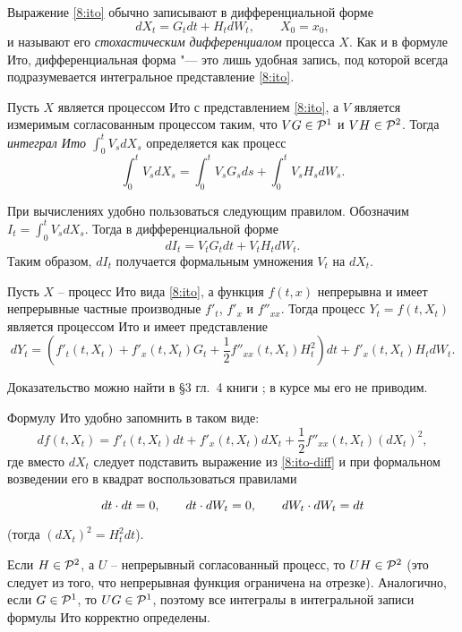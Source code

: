 Выражение \eqref{8:ito} обычно записывают в дифференциальной форме
\begin{equation}
\label{8:ito-diff}
dX_t = G_t dt + H_t dW_t, \qquad X_0=x_0,
\end{equation}
и называют его \emph{стохастическим дифференциалом} процесса $X$.
Как и в формуле Ито, дифференциальная форма "--- это лишь удобная запись, под которой всегда подразумевается интегральное представление \eqref{8:ito}.

\begin{definition}
Пусть $X$ является процессом Ито с представлением \eqref{8:ito}, а $V$ является измеримым согласованным процессом таким, что $VG \in \mathcal{P}^1$ и $VH \in \mathcal{P}^2$.
Тогда \emph{интеграл Ито $\int_0^t V_s d X_s$} определяется как процесс
\[
\int_0^t V_s dX_s = \int_0^t V_s G_s ds + \int_0^t V_s H_s d W_s.
\]
\end{definition}

При вычислениях удобно пользоваться следующим правилом.
Обозначим $I_t = \int_0^t V_s dX_s$. Тогда в дифференциальной форме
\[
d I_t = V_t G_t dt + V_t H_t d W_t.
\]
Таким образом, $d I_t$ получается формальным умножения $V_t$ на $dX_t$.

\begin{theorem}
Пусть $X$ -- процесс Ито вида \eqref{8:ito}, а функция $f(t,x)$ непрерывна и имеет непрерывные частные производные $f'_t$, $f'_x$ и $f''_{xx}$.
Тогда процесс $Y_t = f(t,X_t)$ является процессом Ито и имеет представление
\[
d Y_t = \left(f'_t(t,X_t) + f'_x(t,X_t) G_t + \frac12 f''_{xx}(t,X_t) H_t^2 \right) dt
+ f'_x(t,X_t) H_t d W_t.
\] 
\end{theorem}

\noindent
Доказательство можно найти в \S3 гл.~4 книги \cite{LiptserShiryaev74}; в курсе мы его не приводим.

\medskip
Формулу Ито удобно запомнить в таком виде:
\[
d f(t,X_t) = f'_t(t,X_t) dt + f'_x(t,X_t) dX_t + \frac12 f''_{xx}(t,X_t) (dX_t)^2,
\]
где вместо $d X_t$ следует подставить выражение из \eqref{8:ito-diff} и при формальном возведении его в квадрат воспользоваться правилами
\[
\vphantom{\Big|}dt\cdot dt = 0,\qquad dt\cdot dW_t = 0,\qquad dW_t\cdot dW_t = dt
\]
(тогда $(d X_t)^2 = H_t^2 dt$).

\begin{remark}
Если $H \in \mathcal{P}^2$, а $U$ -- непрерывный согласованный процесс, то $UH \in \mathcal{P}^2$ (это следует из того, что непрерывная функция ограничена на отрезке).
Аналогично, если $G \in \mathcal{P}^1$, то $UG \in \mathcal{P}^1$, поэтому все интегралы в интегральной записи формулы Ито корректно определены.
\end{remark}

